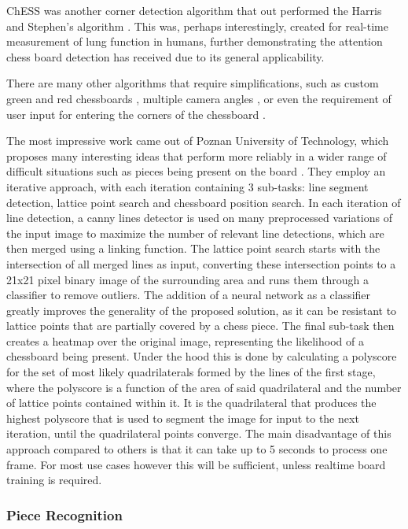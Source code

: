 ChESS was another corner detection algorithm that out performed the Harris and Stephen's algorithm \cite{ChESS}. This was, perhaps
interestingly, created for real-time measurement of lung function in humans, further demonstrating the attention chess board
detection has received due to its general applicability.

There are many other algorithms that require simplifications, such as custom green and red chessboards \cite{5967178, Ding2016ChessVisionC, Danner2015VisualCR}, 
multiple camera angles \cite{5967178},
or even the requirement of user input for entering the corners of the chessboard \cite{mannualcorners, irobot}.

The most impressive work came out of Poznan University of Technology, which proposes many interesting ideas that perform more
reliably in a wider range of difficult situations such as pieces being present on the board \cite{heatmap}.  They employ an iterative
approach, with each iteration containing 3 sub-tasks: line segment detection, lattice point search and chessboard position search.
In each iteration of line detection, a canny lines detector is used on many preprocessed variations of the input image
to maximize the number of relevant line detections, which are then merged using a linking function. The lattice point search starts with
the intersection of all merged lines as input, converting these intersection points to a 21x21 pixel binary image of the surrounding area and
runs them through a classifier to remove outliers.  The addition of a neural network as a classifier greatly improves
the generality of the proposed solution, as it can be resistant to lattice points that are partially covered by a chess piece.
The final sub-task then creates a heatmap over the original image, representing the likelihood of a chessboard being present.
Under the hood this is done by calculating a polyscore for the set of most likely quadrilaterals formed by the lines of the first stage,
where the polyscore is a function of the area of said quadrilateral and the number of lattice points contained within it.
It is the quadrilateral that produces the highest polyscore that is used to segment the image for input to the next iteration, until the quadrilateral
points converge.  The main disadvantage of this approach compared to others is that it can take up to 5 seconds to process one frame.
For most use cases however this will be sufficient, unless realtime board training is required.

\subsubsection{Piece Recognition}


